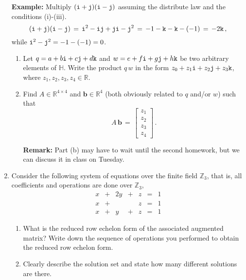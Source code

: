 \documentclass[11pt,table]{article}
\newcommand {\mat}  [1] {\left[\begin{array}{#1}}
\newcommand {\rix}      {\end{array}\right]}
\newcommand{\<}			{\langle}
\renewcommand{\>}      		{\rangle}
\newcommand{\bH}		{\mathbb{H}}
\newcommand{\bR}		{\mathbb{R}}
\newcommand{\bZ}		{\mathbb{Z}}
\def\bfb	{\mathbf{b}}
\begin{document}
\begin{enumerate}
\medskip

{\bf Example:} 
Multiply $({\tt i}+{\tt j})({\tt i}-{\tt j})$ assuming the distribute law 
and the conditions (i)-(iii). 
\[
({\tt i}+{\tt j})({\tt i}-{\tt j}) 
\, = \, 
{\tt i}^2 - {\tt i}{\tt j} + {\tt j}{\tt i}-{\tt j}^2 
\, = \, 
-1-{\tt k}-{\tt k}-(-1) 
\, = \, 
-2{\tt k} \, , 
\]
while ${\tt i}^2 - {\tt j}^2 = -1 - (-1) = 0$.

\medskip

\begin{enumerate}[\rm (a)]
\item 
Let $q = a + b{\tt i} + c{\tt j} + d{\tt k}$ 
and $w = e + f{\tt i} + g{\tt j} + h{\tt k}$ 
be two arbitrary elements of $\bH$. 
Write the product $q\, w$ in the 
form $z_0 + z_1 {\tt i} + z_2 {\tt j} + z_3 {\tt k}$, 
where $z_1, z_2, z_3, z_4 \in \bR$.  

\item 
Find $A \in \bR^{4 \times 4}$ and $\bfb \in \bR^4$ 
(both obviously related to $q$ and/or $w$) such that 
\[
A \, \bfb \, = \, 
\mat{c} 
z_1 \\ z_2 \\ z_3 \\ z_4
\rix \,.
\]

{\bf Remark:} Part (b) may have to wait until the second homework, 
but we can discuss it in class on Tuesday. 
\end{enumerate} 


\medskip
\item 
Consider the following system of equations over 
the finite field  $\bZ_3$, that is, all coefficients and operations are done over $\bZ_3$,
\begin{equation} \label{eqn-prob2}
\begin{array}{rcrcrcr}
x & + & 2y & + & z & = & 1 \\
x & + &  &  & z & = & 1 \\
x & + & y & + & z & = & 1 
\end{array}  
\end{equation}






\begin{enumerate}
	\item  What is the reduced row echelon form of the associated augmented matrix? Write down the sequence of operations you performed to obtain the reduced row echelon form. 
	
	\item Clearly describe the solution set and state how many different solutions are there. 
\end{enumerate}

\end{enumerate}
\end{document}
